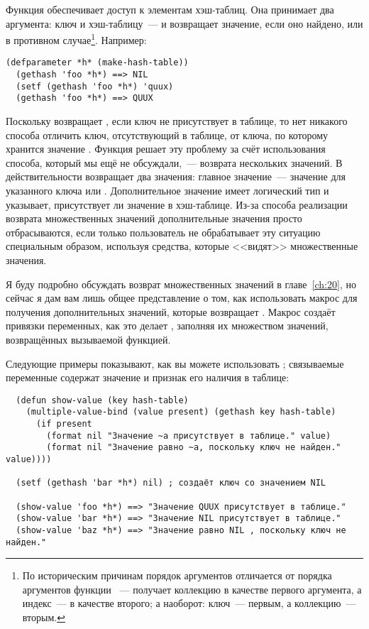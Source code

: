 Функция  обеспечивает доступ к элементам хэш-таблиц.  Она принимает два
аргумента: ключ и хэш-таблицу~--- и возвращает значение, если оно найдено, или  в
противном случае\footnote{По историческим причинам порядок аргументов 
  отличается от порядка аргументов функции ~---  получает коллекцию в
  качестве первого аргумента, а индекс~--- в качестве второго; а  наоборот:
  ключ~--- первым, а коллекцию~--- вторым.}.  Например:

\begin{lstlisting}[style=lisprepl]
  (defparameter *h* (make-hash-table))
  (gethash 'foo *h*) ==> NIL
  (setf (gethash 'foo *h*) 'quux)
  (gethash 'foo *h*) ==> QUUX
\end{lstlisting}

Поскольку  возвращает , если ключ не присутствует в таблице, то нет
никакого способа отличить ключ, отсутствующий в таблице, от ключа, по которому хранится
значение .  Функция  решает эту проблему за счёт использования
способа, который мы ещё не обсуждали,~--- возврата нескольких значений.  В действительности
 возвращает два значения: главное значение~--- значение для указанного ключа
или .  Дополнительное значение имеет логический тип и указывает, присутствует ли
значение в хэш-таблице.  Из-за способа реализации возврата множественных значений
дополнительные значения просто отбрасываются, если только пользователь не обрабатывает эту
ситуацию специальным образом, используя средства, которые <<видят>> множественные значения.

Я буду подробно обсуждать возврат множественных значений в главе~\ref{ch:20}, но сейчас я
дам вам лишь общее представление о том, как использовать макрос 
для получения дополнительных значений, которые возвращает .  Макрос
 создаёт привязки переменных, как это делает ,
заполняя их множеством значений, возвращённых вызываемой функцией.

Следующие примеры показывают, как вы можете использовать ;
связываемые переменные содержат значение и признак его наличия в таблице:

\begin{lstlisting}  
  (defun show-value (key hash-table)
    (multiple-value-bind (value present) (gethash key hash-table)
      (if present
        (format nil "Значение ~a присутствует в таблице." value)
        (format nil "Значение равно ~a, поскольку ключ не найден." value))))

  (setf (gethash 'bar *h*) nil) ; создаёт ключ со значением NIL

  (show-value 'foo *h*) ==> "Значение QUUX присутствует в таблице."
  (show-value 'bar *h*) ==> "Значение NIL присутствует в таблице."
  (show-value 'baz *h*) ==> "Значение равно NIL , поскольку ключ не найден."
\end{lstlisting}

